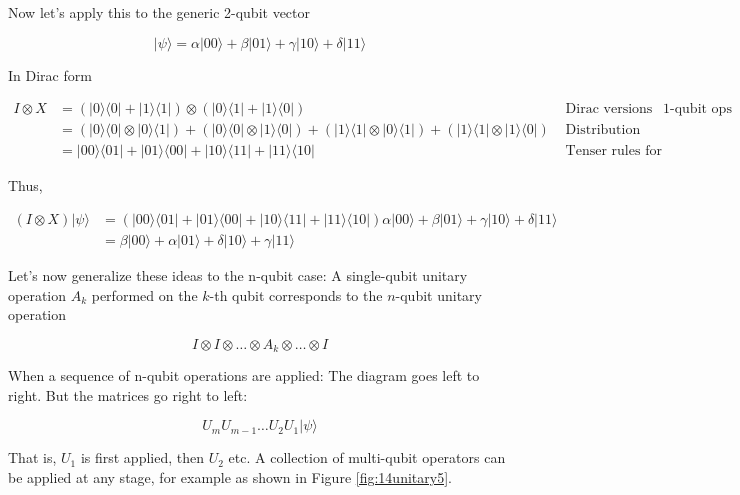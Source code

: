 \documentclass[main.tex]{subfiles}
\begin{document}
    Now let's apply this to the generic 2-qubit vector
    
    $$
    |\psi\rangle=\alpha|00\rangle+\beta|01\rangle+\gamma|10\rangle+\delta|11\rangle
    $$
    
    In Dirac form
    
    $$
    \begin{aligned}
    I \otimes X &=(|0\rangle\langle 0|+| 1\rangle\langle 1|) \otimes(|0\rangle\langle 1|+| 1\rangle\langle 0|) & \text { Dirac versions of the } 1 \text {-qubit ops } \\
    &=(|0\rangle\langle 0|\otimes| 0\rangle\langle 1|)+(|0\rangle\langle 0|\otimes| 1\rangle\langle 0|)+(|1\rangle\langle 1|\otimes| 0\rangle\langle 1|)+(|1\rangle\langle 1|\otimes| 1\rangle\langle 0|) & \text { Distribution over + } \\
    &=|00\rangle\langle 01|+| 01\rangle\langle 00|+| 10\rangle\langle 11|+| 11\rangle\langle 10| & \text { Tenser rules for outer-products }
    \end{aligned}
    $$
    
    Thus,
    
    $$
    \begin{aligned}
    (I \otimes X)|\psi\rangle &=(|00\rangle\langle 01|+| 01\rangle\langle 00|+| 10\rangle\langle 11|+| 11\rangle\langle 10|) \alpha|00\rangle+\beta|01\rangle+\gamma|10\rangle+\delta|11\rangle \\
    &=\beta|00\rangle+\alpha|01\rangle+\delta|10\rangle+\gamma|11\rangle
    \end{aligned}
    $$
    
    Let's now generalize these ideas to the $\mathrm{n}$-qubit case: A single-qubit unitary operation $A_{k}$ performed on the $k$-th qubit corresponds to the $n$-qubit unitary operation
    
    $$
    I \otimes I \otimes \ldots \otimes A_{k} \otimes \ldots \otimes I
    $$
    
    When a sequence of n-qubit operations are applied: The diagram goes left to right. But the matrices go right to left:
    
    $$
    U_{m} U_{m-1} \ldots U_{2} U_{1}|\psi\rangle
    $$
    
    That is, $U_{1}$ is first applied, then $U_{2}$ etc. A collection of multi-qubit operators can be applied at any stage, for example as shown in Figure \ref{fig:14unitary5}.
    
\end{document}
